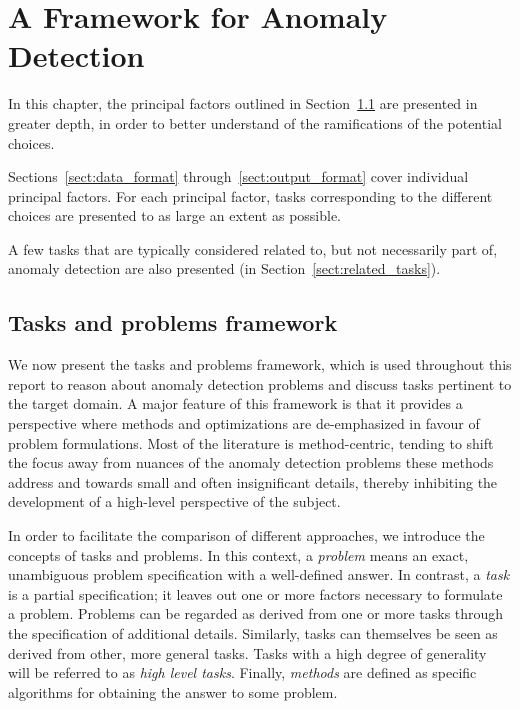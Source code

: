 \chapter{A Framework for Anomaly Detection}
\label{ch:framework}

In this chapter, the principal factors outlined in Section~\ref{sect:tasks_problems} are presented in greater depth, in order to better understand of the ramifications of the potential choices.

Sections~\ref{sect:data_format} through~\ref{sect:output_format} cover individual principal factors. For each principal factor, tasks corresponding to the different choices are presented to as large an extent as possible.

A few tasks that are typically considered related to, but not necessarily part of, anomaly detection are also presented (in Section~\ref{sect:related_tasks}).

\section{Tasks and problems framework}
\label{sect:tasks_problems}

We now present the tasks and problems framework, which is used throughout this report to reason about anomaly detection problems and discuss tasks pertinent to the target domain. A major feature of this framework is that it provides a perspective where methods and optimizations are de-emphasized in favour of problem formulations. Most of the literature is method-centric, tending to shift the focus away from nuances of the anomaly detection problems these methods address and towards small and often insignificant details, thereby inhibiting the development of a high-level perspective of the subject.

In order to facilitate the comparison of different approaches, we introduce the concepts of tasks and problems. In this context, a \emph{problem} means an exact, unambiguous problem specification with a well-defined answer. In contrast, a \emph{task} is a partial specification; it leaves out one or more factors necessary to formulate a problem. Problems can be regarded as derived from one or more tasks through the specification of additional details. Similarly, tasks can themselves be seen as derived from other, more general tasks. Tasks with a high degree of generality will be referred to as \emph{high level tasks}. Finally, \emph{methods} are defined as specific algorithms for obtaining the answer to some problem.

